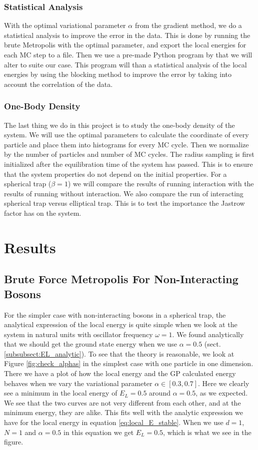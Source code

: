 \documentclass[12pt,a4paper,english]{article}
\begin{document}
\subsubsection{Statistical Analysis}
\label{subsubsect:Coding_statistical}
With the optimal variational parameter $\alpha$ from the gradient method, we do a statistical analysis to improve the error in the data. This is done by running the brute Metropolis with the optimal parameter, and export the local energies for each MC step to a file. Then we use a pre-made Python program by \citet{jonsson2018standard} that we will alter to suite our case. This program will than a statistical analysis of the local energies by using the blocking method to improve the error by taking into account the correlation of the data.

\subsubsection{One-Body Density}
\label{subsubsect:Coding_onebody_density}
The last thing we do in this project is to study the one-body density of the system. We will use the optimal parameters to calculate the coordinate of every particle and place them into histograms for every MC cycle. Then we normalize by the number of particles and number of MC cycles. The radius sampling is first initialized after the equilibration time of the system has passed. This is to ensure that the system properties do not depend on the initial properties. For a spherical trap ($\beta=1$) we will compare the results of running interaction with the results of running without interaction. We also compare the run of interacting spherical trap versus elliptical trap. This is to test the importance the Jastrow factor has on the system.

\section{Results}
\label{sect:Results}
\subsection{Brute Force Metropolis For Non-Interacting Bosons}
\label{subsect:Result_brute_non-int}
For the simpler case with non-interacting bosons in a spherical trap, the analytical expression of the local energy is quite simple when we look at the system in natural units with oscillator frequency $\omega=1$. We found analytically that we should get the ground state energy when we use $\alpha=0.5$ (sect. \ref{subsubsect:EL_analytic}). To see that the theory is reasonable, we look at Figure \ref{fig:check_alphas} in the simplest case with one particle in one dimension. There we have a plot of how the local energy and the GP calculated energy behaves when we vary the variational parameter $\alpha\in[0.3,0.7]$. Here we clearly see a minimum in the local energy of $E_L=0.5$ around $\alpha=0.5$, as we expected. We see that the two curves are not very different from each other, and at the minimum energy, they are alike. This fits well with the analytic expression we have for the local energy in equation \ref{eq:local_E_stable}. When we use $d=1$, $N=1$ and $\alpha=0.5$ in this equation we get $E_L=0.5$, which is what we see in the figure.
\end{document}

